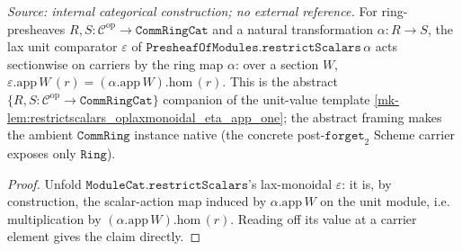 \begin{lemma}\label{mk-lem:restrictscalars_laxmonoidal_eps_app}
  \leanok

  \textit{Source: internal categorical construction; no external reference.}
  For ring-presheaves \(R, S : \mathcal C^{\mathrm{op}} \to \mathtt{CommRingCat}\) and a natural
  transformation \(\alpha : R \to S\), the lax unit comparator \(\varepsilon\) of
  \(\mathtt{PresheafOfModules.restrictScalars}\,\alpha\) acts sectionwise on carriers by the ring map
  \(\alpha\): over a section \(W\), \(\varepsilon.\mathrm{app}\,W\,(r) = (\alpha.\mathrm{app}\,W).\mathrm{hom}\,(r)\).
  This is the abstract \(\{R,S : \mathcal C^{\mathrm{op}} \to \mathtt{CommRingCat}\}\) companion of the
  unit-value template \ref{mk-lem:restrictscalars_oplaxmonoidal_eta_app_one}; the abstract framing makes
  the ambient \(\mathtt{CommRing}\) instance native (the concrete post-\(\mathtt{forget}_2\) Scheme
  carrier exposes only \(\mathtt{Ring}\)).
\end{lemma}
\begin{proof}
  \leanok
  Unfold \(\mathtt{ModuleCat.restrictScalars}\)'s lax-monoidal \(\varepsilon\): it is, by construction,
  the scalar-action map induced by \(\alpha.\mathrm{app}\,W\) on the unit module, i.e. multiplication by
  \((\alpha.\mathrm{app}\,W).\mathrm{hom}\,(r)\). Reading off its value at a carrier element gives the
  claim directly.
\end{proof}

